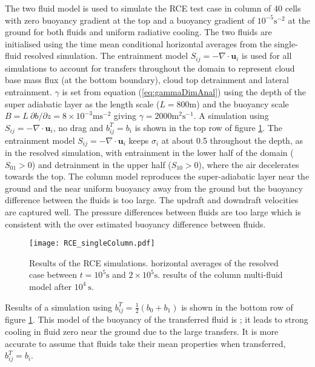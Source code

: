 \documentclass[draft]{agujournal2019}
\begin{document}
The two fluid model is used to simulate the RCE test case in 
column of 40 cells with zero buoyancy gradient at the top and a buoyancy
gradient of $10^{-5}\text{s}^{-2}$ at the ground for both fluids
and uniform radiative cooling. The two fluids are initialised using
the time mean conditional horizontal averages from the single-fluid
resolved simulation. The entrainment model $S_{ij}=-\nabla\cdot\mathbf{u}_{i}$
is used for all simulations to account for transfers throughout the
domain to represent cloud base mass flux (at the bottom boundary),
cloud top detrainment and lateral entrainment. $\gamma$ is set from
equation (\ref{eq:gammaDimAnal}) using the depth of the  super adiabatic
layer as the length scale ($L=800\text{m}$) and the buoyancy scale
$B=L\ \partial b/\partial z=8\times10^{-3}\text{m}\text{s}^{-2}$
giving $\gamma=2000\text{m}^{2}\text{s}^{-1}$. 
A simulation using
$S_{ij}=-\nabla\cdot\mathbf{u}_{i}$, no drag and $b_{ij}^{T}=b_{i}$
is shown in the top row of figure \ref{fig:RCE_singleColumn}.
The entrainment model $S_{ij}=-\nabla\cdot\mathbf{u}_{i}$ keeps $\sigma_{i}$
at about 0.5 throughout the depth, as in the resolved simulation,
with entrainment in the lower half of the domain ($S_{01}>0$) and
detrainment in the upper half ($S_{10}>0$), where the air decelerates
towards the top. The  column model reproduces the super-adiabatic
layer near the ground and the near uniform buoyancy away from the
ground but the buoyancy difference between the fluids is too large.
The updraft and downdraft velocities are captured well. The pressure
differences between fluids are too large which is consistent with
the over estimated buoyancy difference between fluids. 

\begin{figure}
\noindent
\texttt{[image: RCE\_singleColumn.pdf]}
\caption{\label{fig:RCE_singleColumn}
Results of the RCE simulations. \protect{} horizontal averages
of the resolved case between $t=10^{5}\text{s}$ and $2\times10^{5}\text{s}$. \protect{} results of the  column multi-fluid model after $10^{4}\ \text{s}$. }
\end{figure}

Results of a simulation using $b_{ij}^{T}=\frac{1}{2}(b_{0}+b_{1})$
is shown in the bottom row of figure \ref{fig:RCE_singleColumn}.
This model of the buoyancy of the transferred fluid is ; it leads
to strong cooling in fluid zero near the ground due to the large transfers.
It is more accurate to assume that fluids take their mean properties
when transferred, $b_{ij}^{T}=b_{i}$. 
\end{document}
